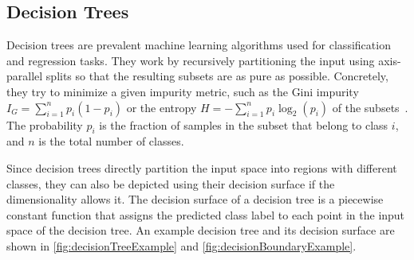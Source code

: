 \subsection{Decision Trees}

Decision trees are prevalent machine learning algorithms used for classification and regression tasks. They work by recursively partitioning the input using axis-parallel splits so that the resulting subsets are as pure as possible. Concretely, they try to minimize a given impurity metric, such as the Gini impurity $I_G = \sum_{i=1}^{n} p_i(1-p_i)$ or the entropy $H = -\sum_{i=1}^{n} p_i \log_2(p_i)$ of the subsets~\cite{10.5555/2380985}. The probability $p_i$ is the fraction of samples in the subset that belong to class $i$, and $n$ is the total number of classes.

Since decision trees directly partition the input space into regions with different classes, they can also be depicted using their decision surface if the dimensionality allows it. The decision surface of a decision tree is a piecewise constant function that assigns the predicted class label to each point in the input space of the decision tree. An example decision tree and its decision surface are shown in \autoref{fig:decisionTreeExample} and \autoref{fig:decisionBoundaryExample}.

